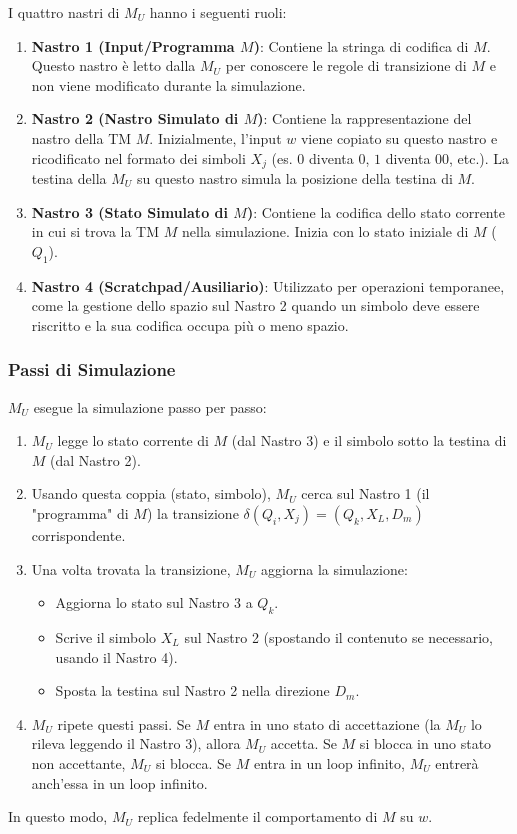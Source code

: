 \documentclass[a4paper]{article}
\begin{document}
I quattro nastri di $M_U$ hanno i seguenti ruoli:
\begin{enumerate}
    \item \textbf{Nastro 1 (Input/Programma $M$)}: Contiene la stringa di codifica di $M$. Questo nastro è letto dalla $M_U$ per conoscere le regole di transizione di $M$ e non viene modificato durante la simulazione.
    \item \textbf{Nastro 2 (Nastro Simulato di $M$)}: Contiene la rappresentazione del nastro della TM $M$. Inizialmente, l'input $w$ viene copiato su questo nastro e ricodificato nel formato dei simboli $X_j$ (es. $0$ diventa $0$, $1$ diventa $00$, etc.). La testina della $M_U$ su questo nastro simula la posizione della testina di $M$.
    \item \textbf{Nastro 3 (Stato Simulato di $M$)}: Contiene la codifica dello stato corrente in cui si trova la TM $M$ nella simulazione. Inizia con lo stato iniziale di $M$ ($Q_1$).
    \item \textbf{Nastro 4 (Scratchpad/Ausiliario)}: Utilizzato per operazioni temporanee, come la gestione dello spazio sul Nastro 2 quando un simbolo deve essere riscritto e la sua codifica occupa più o meno spazio.
\end{enumerate}

\subsubsection{Passi di Simulazione}
$M_U$ esegue la simulazione passo per passo:
\begin{enumerate}
    \item $M_U$ legge lo stato corrente di $M$ (dal Nastro 3) e il simbolo sotto la testina di $M$ (dal Nastro 2).
    \item Usando questa coppia (stato, simbolo), $M_U$ cerca sul Nastro 1 (il "programma" di $M$) la transizione $\delta(Q_i, X_j) = (Q_k, X_L, D_m)$ corrispondente.
    \item Una volta trovata la transizione, $M_U$ aggiorna la simulazione:
    \begin{itemize}
        \item Aggiorna lo stato sul Nastro 3 a $Q_k$.
        \item Scrive il simbolo $X_L$ sul Nastro 2 (spostando il contenuto se necessario, usando il Nastro 4).
        \item Sposta la testina sul Nastro 2 nella direzione $D_m$.
    \end{itemize}
    \item $M_U$ ripete questi passi. Se $M$ entra in uno stato di accettazione (la $M_U$ lo rileva leggendo il Nastro 3), allora $M_U$ accetta. Se $M$ si blocca in uno stato non accettante, $M_U$ si blocca. Se $M$ entra in un loop infinito, $M_U$ entrerà anch'essa in un loop infinito.
\end{enumerate}
In questo modo, $M_U$ replica fedelmente il comportamento di $M$ su $w$.
\end{document}
